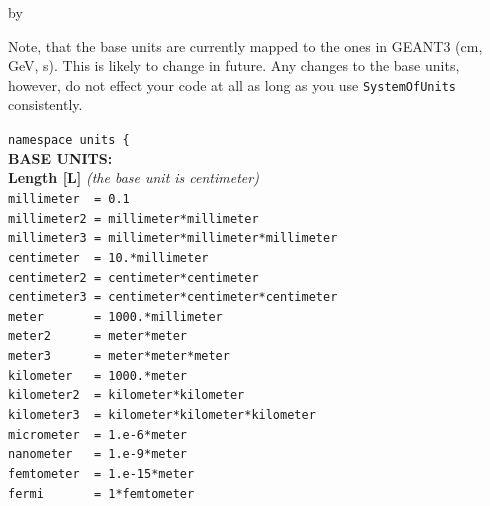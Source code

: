 \documentclass[twoside]{article}
\newcommand{\entrylabel}[1]{\mbox{\textbf{{#1}}}\hfil}%
\newenvironment{entry}
{\begin{list}{}%
    {\renewcommand{\makelabel}{\entrylabel}%
     \setlength{\labelwidth}{90pt}%
     \setlength{\leftmargin}{\labelwidth}
     \advance\leftmargin by \labelsep%
      }%
    }%
  {\end{list}}
\newcommand{\Entrylabel}[1]%
{\raisebox{0pt}[1ex][0pt]{\makebox[\labelwidth][l]%
    {\parbox[t]{\labelwidth}{\hspace{0pt}\textbf{{#1}}}}}}
\newenvironment{Entry}%
{\renewcommand{\entrylabel}{\Entrylabel}\begin{entry}}%
  {\end{entry}}
\begin{document}
\begin{description}
\begin{Entry}
    Note, that the base units are currently mapped to the ones in
    GEANT3 (cm, GeV, s).  This is likely to change in
    future. Any changes to the base units, however, do not effect your
    code at all as long as you use \texttt{SystemOfUnits}
    consistently.
  
  \verb+namespace units {+\\
  {\bf BASE UNITS: \\Length [L]} {\it (the base unit is centimeter)}\\
  \verb+millimeter  = 0.1+ \\  
  \verb+millimeter2 = millimeter*millimeter+\\
  \verb+millimeter3 = millimeter*millimeter*millimeter+\\

  \verb+centimeter  = 10.*millimeter+ \\
  \verb+centimeter2 = centimeter*centimeter+ \\
  \verb+centimeter3 = centimeter*centimeter*centimeter+ \\

  \verb+meter       = 1000.*millimeter+ \\  
  \verb+meter2      = meter*meter+ \\
  \verb+meter3      = meter*meter*meter+ \\

  \verb+kilometer   = 1000.*meter+ \\
  \verb+kilometer2  = kilometer*kilometer+ \\
  \verb+kilometer3  = kilometer*kilometer*kilometer+ \\

  \verb+micrometer  = 1.e-6*meter+ \\
  \verb+nanometer   = 1.e-9*meter+ \\
  \verb+femtometer  = 1.e-15*meter+ \\
  \verb+fermi       = 1*femtometer+ \\


\end{Entry}
\end{description}
\end{document}
